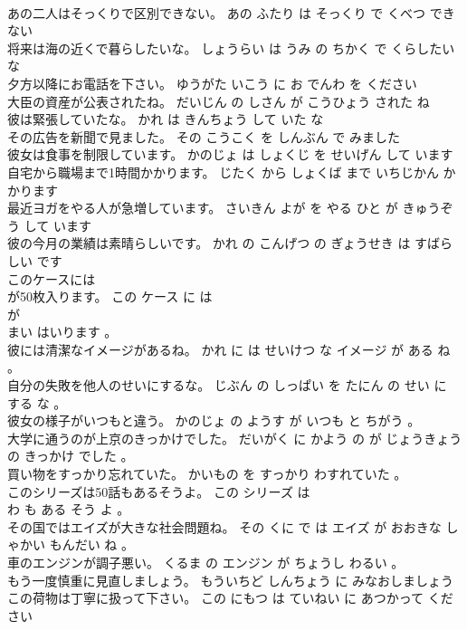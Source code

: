 \documentclass[8pt]{extreport}
\begin{document}
\begin{CJK}{UTF8}{min}
\\	あの二人はそっくりで区別できない。	あの ふたり は そっくり で くべつ できない 
\\	将来は海の近くで暮らしたいな。	しょうらい は うみ の ちかく で くらしたい な 
\\	夕方以降にお電話を下さい。	ゆうがた いこう に お でんわ を ください 
\\	大臣の資産が公表されたね。	だいじん の しさん が こうひょう された ね 
\\	彼は緊張していたな。	かれ は きんちょう して いた な 
\\	その広告を新聞で見ました。	その こうこく を しんぶん で みました 
\\	彼女は食事を制限しています。	かのじょ は しょくじ を せいげん して います 
\\	自宅から職場まで1時間かかります。	じたく から しょくば まで いちじかん かかります 
\\	最近ヨガをやる人が急増しています。	さいきん よが を やる ひと が きゅうぞう して います 
\\	彼の今月の業績は素晴らしいです。	かれ の こんげつ の ぎょうせき は すばらしい です 
\\	このケースには
\\	が50枚入ります。	この ケース に は 
\\	が 
\\	まい はいります 。 
\\	彼には清潔なイメージがあるね。	かれ に は せいけつ な イメージ が ある ね 。 
\\	自分の失敗を他人のせいにするな。	じぶん の しっぱい を たにん の せい に する な 。 
\\	彼女の様子がいつもと違う。	かのじょ の ようす が いつも と ちがう 。 
\\	大学に通うのが上京のきっかけでした。	だいがく に かよう の が じょうきょう の きっかけ でした 。 
\\	買い物をすっかり忘れていた。	かいもの を すっかり わすれていた 。 
\\	このシリーズは50話もあるそうよ。	この シリーズ は 
\\	わ も ある そう よ 。 
\\	その国ではエイズが大きな社会問題ね。	その くに で は エイズ が おおきな しゃかい もんだい ね 。 
\\	車のエンジンが調子悪い。	くるま の エンジン が ちょうし わるい 。 
\\	もう一度慎重に見直しましょう。	もういちど しんちょう に みなおしましょう 
\\	この荷物は丁寧に扱って下さい。	この にもつ は ていねい に あつかって ください 

\end{CJK}
\end{document}
